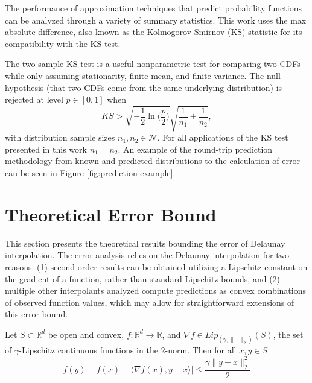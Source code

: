 \documentclass[smallextended,final]{svjour3}       %
\begin{document}
The performance of approximation techniques that predict probability functions can be analyzed through a variety of summary statistics. This work uses the max absolute difference, also known as the Kolmogorov-Smirnov (KS) statistic \cite{lilliefors1967kolmogorov} for its compatibility with the KS test.

The two-sample KS test is a useful nonparametric test for comparing two CDFs while only assuming stationarity, finite mean, and finite variance. The null hypothesis (that two CDFs come from the same underlying distribution) is rejected at level $p \in [0,1]$ when
$$ KS > \sqrt{-\frac{1}{2}\ln\biggl(\frac{p}{2}\biggr)} \sqrt{\frac{1}{n_1} + \frac{1}{n_2}}, $$
with distribution sample sizes $n_1,n_2 \in \mathcal{N}$. For all applications of the KS test presented in this work $n_1 = n_2$. An example of the round-trip prediction methodology from known and predicted distributions to the calculation of error can be seen in Figure \ref{fig:prediction-example}.

\section{Theoretical Error Bound}
\label{sec:theory}

This section presents the theoretical results bounding the error of Delaunay
interpolation. The error analysis relies on the Delaunay interpolation for
two reasons: (1) second order results can be obtained utilizing a Lipschitz
constant on the gradient of a function, rather than standard Lipschitz
bounds, and (2) multiple other interpolants analyzed compute predictions
as convex combinations of observed function values, which may allow for
straightforward extensions of this error bound.

\begin{plainlemma}
  \label{lemma:1}
  Let $S \subset \mathbb{R}^d$ be open and convex, $f: \mathbb{R}^d \rightarrow \mathbb{R}$, and $\nabla f \in Lip_{(\gamma,\|\cdot\|_2)}(S)$, the set of $\gamma$-Lipschitz continuous functions in the $2$-norm. Then for all $x,y \in S$
  $$\big|f(y) - f(x) - \langle \nabla f(x), y - x \rangle \big| \leq \frac{\gamma \|y - x\|_2^2}{2}.$$
\end{plainlemma}
\end{document}
